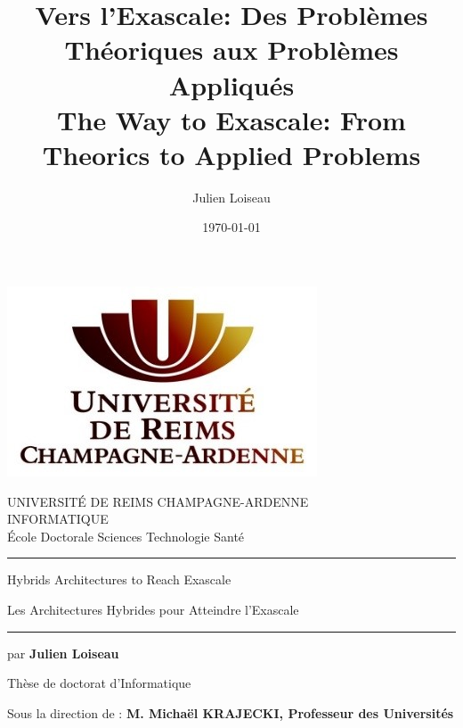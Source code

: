 \documentclass[11pt,a4paper]{book}
\title{Vers l'Exascale: Des Probl\`emes Th\'eoriques aux Probl\`emes Appliqu\'es\\
The Way to Exascale: From Theorics to Applied Problems}
\author{Julien Loiseau}
\date{\today}
\begin{document}
\thispagestyle{empty}
{%
%
\centering
{
\includegraphics[scale=1]{figures/style/logo_urca_front_page.jpg}
\vspace{0.5cm}
}

{
UNIVERSIT\'E DE REIMS CHAMPAGNE-ARDENNE\\
\vspace{0.5cm}
INFORMATIQUE\\
\vspace{0.5cm}
\'Ecole Doctorale Sciences Technologie Sant\'e
}

\vspace{1.0cm}
{\hrule height 2pt\vspace{2pt}}

\Large

{\huge 
\vspace{1cm}
Hybrids Architectures to Reach Exascale
}

{
\vspace{0.5cm}
Les Architectures Hybrides pour Atteindre l'Exascale 
}

\vspace{1.0cm}
\hrule

\vspace{1.5cm}

{\LARGE
par \textbf{Julien Loiseau}
}

\vspace{2cm}

{
Th\`ese de doctorat d'Informatique
}

\vspace{2cm}

{
Sous la direction de : \textbf{M. Michaël KRAJECKI, Professeur des Universités}
}
\vspace{0.5cm}

\vspace{\fill}

}
\end{document}
